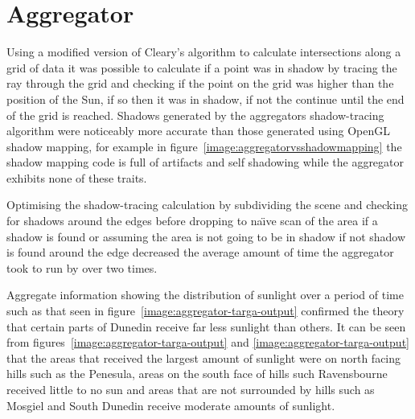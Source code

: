 \documentclass[12pt]{report}
\begin{document}
\section{Aggregator}
Using a modified version of Cleary's algorithm\cite{cleary} to calculate intersections along a grid of data it was possible to calculate if a point was in shadow by tracing the ray through the grid and checking if the point on the grid was higher than the position of the Sun, if so then it was in shadow, if not the continue until the end of the grid is reached. Shadows generated by the aggregators shadow-tracing algorithm were noticeably more accurate than those generated using OpenGL shadow mapping, for example in figure~\ref{image:aggregatorvsshadowmapping} the shadow mapping code is full of artifacts and self shadowing while the aggregator exhibits none of these traits.

 Optimising the shadow-tracing calculation by subdividing the scene and checking for shadows around the edges before dropping to na\"{\i}ve scan of the area if a shadow is found or assuming the area is not going to be in shadow if not shadow is found around the edge decreased the average amount of time the aggregator took to run by over two times.

Aggregate information showing the distribution of sunlight over a period of time such as that seen in figure~\ref{image:aggregator-targa-output} confirmed the theory that certain parts of Dunedin receive far less sunlight than others. It can be seen from figures~\ref{image:aggregator-targa-output} and \ref{image:aggregator-targa-output} that the areas that received the largest amount of sunlight were on north facing hills such as the Penesula, areas on the south face of hills such Ravensbourne received little to no sun and areas that are not surrounded by hills such as Mosgiel and South Dunedin receive moderate amounts of sunlight.



\end{document}
